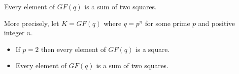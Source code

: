 Every element of $GF(q)$ is a sum of two squares.

More precisely, let $K = GF(q)$ where $q = p^n$ for some prime $p$ and positive integer $n$.
\begin{itemize}
\item[(iii)] If $p=2$ then every element of $GF(q)$ is a square.
\item[(iv)] Every element of $GF(q)$ is a sum of two squares.
\end{itemize}